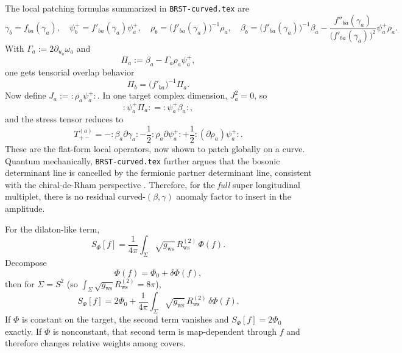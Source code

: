 \documentclass[11pt]{article}
\begin{document}
The local patching formulas summarized in \texttt{BRST-curved.tex} are
\begin{equation}\label{eq:super-patching-summary}
\gamma_b=f_{ba}(\gamma_a),\quad
\psi_b^+=f'_{ba}(\gamma_a)\psi_a^+,\quad
\rho_b=\bigl(f'_{ba}(\gamma_a)\bigr)^{-1}\rho_a,\quad
\beta_b=\bigl(f'_{ba}(\gamma_a)\bigr)^{-1}\beta_a-\frac{f''_{ba}(\gamma_a)}{\bigl(f'_{ba}(\gamma_a)\bigr)^2}\psi_a^+\rho_a.
\end{equation}
With $\Gamma_a:=2\partial_{u_a}\omega_a$ and
\begin{equation}
\Pi_a:=\beta_a-\Gamma_a\rho_a\psi_a^+,
\end{equation}
one gets tensorial overlap behavior
\begin{equation}\label{eq:covariant-momentum-summary}
\Pi_b=\bigl(f'_{ba}\bigr)^{-1}\Pi_a.
\end{equation}
Now define $J_a:=:\rho_a\psi_a^+:$. In one target complex dimension, $J_a^2=0$, so
\begin{equation}\label{eq:supercurrent-global-summary}
:\psi_a^+\Pi_a: = :\psi_a^+\beta_a:,
\end{equation}
and the stress tensor reduces to
\begin{equation}\label{eq:stress-global-summary}
T_{+-}^{(a)}
=
-:\beta_a\partial\gamma_a:
-\frac12:\rho_a\partial\psi_a^+:
+\frac12:(\partial\rho_a)\psi_a^+:.
\end{equation}
These are the flat-form local operators, now shown to patch globally on a curve. Quantum mechanically, \texttt{BRST-curved.tex} further argues that the bosonic determinant line is cancelled by the fermionic partner determinant line, consistent with the chiral-de-Rham perspective \cite{msv1999chiralderham,benzvi2008supersymmetrycdr}. Therefore, for the \emph{full} super longitudinal multiplet, there is no residual curved-$(\beta,\gamma)$ anomaly factor to insert in the amplitude.

For the dilaton-like term,
\begin{equation}\label{eq:dilaton-term}
S_\Phi[f]
=
\frac{1}{4\pi}\int_\Sigma \sqrt{g_{\mathrm{ws}}}\,R^{(2)}_{\mathrm{ws}}\,\Phi(f).
\end{equation}
Decompose
\begin{equation}
\Phi(f)=\Phi_0+\delta\Phi(f),
\end{equation}
then for $\Sigma=S^2$ (so $\int_\Sigma \sqrt{g_{\mathrm{ws}}}R^{(2)}_{\mathrm{ws}}=8\pi$),
\begin{equation}\label{eq:Sphi-sphere}
S_\Phi[f]
=
2\Phi_0
+\frac{1}{4\pi}\int_\Sigma \sqrt{g_{\mathrm{ws}}}\,R^{(2)}_{\mathrm{ws}}\,\delta\Phi(f).
\end{equation}
If $\Phi$ is constant on the target, the second term vanishes and $S_\Phi[f]=2\Phi_0$ exactly.
If $\Phi$ is nonconstant, that second term is map-dependent through $f$ and therefore changes relative weights among covers.
\end{document}
